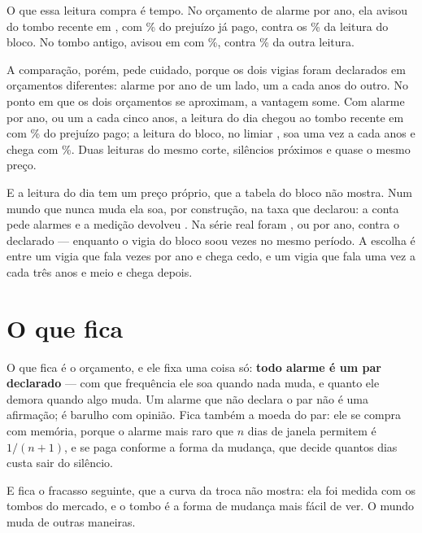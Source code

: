 O que essa leitura compra é tempo. No orçamento de \numFundoUmAnoAlarmesPorAno{} alarme por
ano, ela avisou do tombo recente em \numSegundaLeituraTomboRecenteData, com
\numSegundaLeituraTomboRecentePagoPct\% do prejuízo já pago, contra os
\numVigiaTomboRecentePagoPct\% da leitura do bloco. No tombo antigo, avisou em
\numSegundaLeituraTomboAntigoData{} com \numSegundaLeituraTomboAntigoPagoPct\%, contra
\numVigiaTomboAntigoPagoPct\% da outra leitura.

A comparação, porém, pede cuidado, porque os dois vigias foram declarados em orçamentos
diferentes: \numFundoUmAnoAlarmesPorAno{} alarme por ano de um lado, um a cada
\numVigiaAnosParadoPorAlarme{} anos do outro. No ponto em que os dois orçamentos se aproximam,
a vantagem some. Com \numFundoCincoAnosAlarmesPorAno{} alarme por ano, ou um a cada cinco
anos, a leitura do dia chegou ao tombo recente em \numSegundaLeituraCincoAnosTomboRecenteData{}
com \numSegundaLeituraCincoAnosTomboRecentePagoPct\% do prejuízo pago; a leitura do bloco, no
limiar \numTrocaOitoLimiar, soa uma vez a cada \numTrocaOitoAnos{} anos e chega com
\numTrocaOitoPagoPct\%. Duas leituras do mesmo corte, silêncios próximos e quase o mesmo preço.

E a leitura do dia tem um preço próprio, que a tabela do bloco não mostra. Num mundo que nunca
muda ela soa, por construção, na taxa que declarou: a conta pede
\numSegundaLeituraParadoDeclarado{} alarmes e a medição devolveu \numSegundaLeituraParadoAlarmes{}.
Na série real foram \numSegundaLeituraAlarmesReais{}, ou \numSegundaLeituraAlarmesAno{} por ano,
contra o \numFundoUmAnoAlarmesPorAno{} declarado --- enquanto o vigia do bloco soou
\numVigiaAlarmesReais{} vezes no mesmo período. A escolha é entre um vigia que fala \numSegundaLeituraAlarmesAno{}
vezes por ano e chega cedo, e um vigia que fala uma vez a cada três anos e meio e chega depois.

\section{O que fica}

O que fica é o orçamento, e ele fixa uma coisa só: \textbf{todo alarme é um par declarado} ---
com que frequência ele soa quando nada muda, e quanto ele demora quando algo muda. Um alarme que não declara o par não é uma afirmação; é barulho com opinião. Fica também
a moeda do par: ele se compra com memória, porque o alarme mais raro que $n$ dias de janela
permitem é $1/(n+1)$, e se paga conforme a forma da mudança, que decide quantos dias custa
sair do silêncio.

E fica o fracasso seguinte, que a curva da troca não mostra: ela foi medida com os tombos do
mercado, e o tombo é a forma de mudança mais fácil de ver. O mundo muda de outras maneiras.
